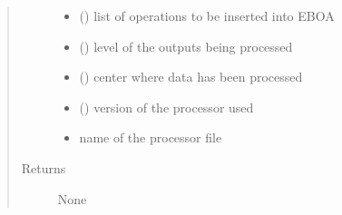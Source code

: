 \begin{fulllineitems}
\begin{quote}
\begin{description}
\begin{itemize}
\item {} 
 () \textendash{} list of operations to be inserted into EBOA

\item {} 
 () \textendash{} level of the outputs being processed

\item {} 
 () \textendash{} center where data has been processed

\item {} 
 () \textendash{} version of the processor used

\item {} 
 \textendash{} name of the processor file

\end{itemize}

\item[{Returns}] \leavevmode
None

\end{description}\end{quote}

\end{fulllineitems}


